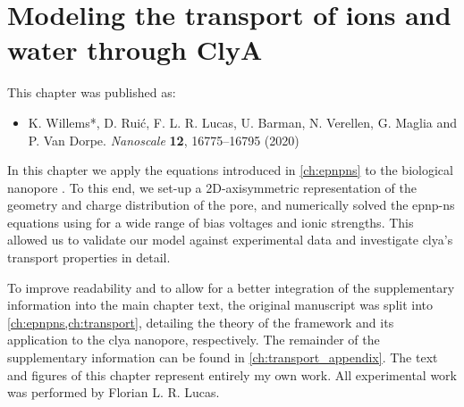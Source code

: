 \chapter{Modeling the transport of ions and water through {ClyA}}
%
\label{ch:transport}
%






%
%
\begin{shaded}
This chapter was published as:
%
\begin{itemize}
  \item K. Willems*, D. Rui\'{c}, F. L. R. Lucas, U. Barman, N. Verellen, G. Maglia and P. Van Dorpe.
        \textit{Nanoscale} \textbf{12}, 16775--16795 (2020) %
\end{itemize}
%
\newpage
\end{shaded}
%
%

%

In this chapter we apply the  equations introduced in \cref{ch:epnpns} to the biological
nanopore . To this end, we set-up a 2D-axisymmetric representation of the geometry and charge
distribution of the pore, and numerically solved the \gls{epnp-ns} equations using  for a wide
range of bias voltages and ionic strengths. This allowed us to validate our model against experimental data
and investigate \gls{clya}'s transport properties in detail.
%

%
To improve readability and to allow for a better integration of the supplementary information into the main
chapter text, the original manuscript was split into \cref{ch:epnpns,ch:transport}, detailing the theory of
the framework and its application to the \gls{clya} nanopore, respectively. The remainder of the supplementary
information can be found in \cref{ch:transport_appendix}. The text and figures of this chapter represent
entirely my own work. All experimental work was performed by Florian L. R. Lucas.
%

